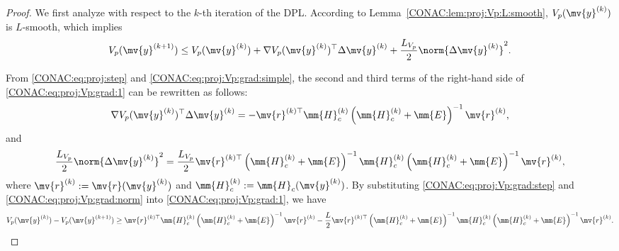 \begin{proof}
  We first analyze with respect to the $k$-th iteration of the DPL.
  According to Lemma~\ref{CONAC:lem:proj:Vp:L:smooth}, $V_p(\mv{y}^{(k)})$ is $L$-smooth, which implies 
  \begin{equation}
    \label{CONAC:eq:proj:Vp:grad:1}
    V_p(\mv{y}^{(k+1)})
    \le
    V_p(\mv{y}^{(k)})
    +
    \nabla V_p(\mv{y}^{(k)})^\top
    \Delta\mv{y}^{(k)}
    +
    \frac{L_{V_p}}{2}
    \norm{\Delta\mv{y}^{(k)}}^2
    .
  \end{equation}

  From \eqref{CONAC:eq:proj:step} and \eqref{CONAC:eq:proj:Vp:grad:simple}, the second and third terms of the right-hand side of \eqref{CONAC:eq:proj:Vp:grad:1} can be rewritten as follows:
  \begin{equation}
    \label{CONAC:eq:proj:Vp:grad:step}
    \nabla V_p(\mv{y}^{(k)})^\top
    \Delta\mv{y}^{(k)}
    =
    -\mv{r}^{(k)\top}
    \mm{H}_c^{(k)}
    \left(
      \mm{H}_c^{(k)}
      +\mm{E}
    \right)^{-1}
    \mv{r}^{(k)}
    ,
  \end{equation} 
  and
  \begin{equation}
    \label{CONAC:eq:proj:Vp:grad:norm}
    \frac{L_{V_p}}{2}
    \norm{\Delta\mv{y}^{(k)}}^2
    =
    \frac{L_{V_p}}{2}
    \mv{r}^{(k)\top}
    \left(
      \mm{H}_c^{(k)}
      +\mm{E}
    \right)^{-1}
    \mm{H}_c^{(k)}
    \left(
      \mm{H}_c^{(k)}
      +\mm{E}
    \right)^{-1}
    \mv{r}^{(k)}
    ,
  \end{equation}
  where $\mv{r}^{(k)}:=\mv{r}(\mv{y}^{(k)})$ and $\mm{H}_c^{(k)}:=\mm{H}_c(\mv{y}^{(k)})$.
  By substituting \eqref{CONAC:eq:proj:Vp:grad:step} and \eqref{CONAC:eq:proj:Vp:grad:norm} into \eqref{CONAC:eq:proj:Vp:grad:1}, we have
  \begin{equation}
    \label{CONAC:eq:proj:Vp:grad:2}
    V_p(\mv{y}^{(k)})
    -
    V_p(\mv{y}^{(k+1)})
    \ge
    \mv{r}^{(k)\top}
    \mm{H}_c^{(k)}
    \left(
      \mm{H}_c^{(k)}
      +\mm{E}
    \right)^{-1}
    \mv{r}^{(k)}
    -
    \frac{L}{2}
    \mv{r}^{(k)\top}
    \left(
      \mm{H}_c^{(k)}
      +\mm{E}
    \right)^{-1}
    \mm{H}_c^{(k)}
    \left(
      \mm{H}_c^{(k)}
      +\mm{E}
    \right)^{-1}
    \mv{r}^{(k)}
    .
  \end{equation}


\end{proof}
